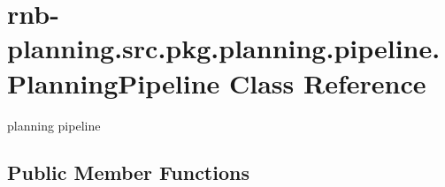 \hypertarget{classrnb-planning_1_1src_1_1pkg_1_1planning_1_1pipeline_1_1_planning_pipeline}{}\section{rnb-\/planning.src.\+pkg.\+planning.\+pipeline.\+Planning\+Pipeline Class Reference}
\label{classrnb-planning_1_1src_1_1pkg_1_1planning_1_1pipeline_1_1_planning_pipeline}


planning pipeline  


\subsection*{Public Member Functions}
